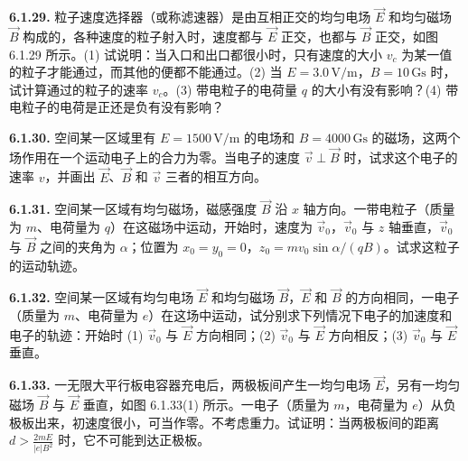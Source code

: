 \begin{center}
\end{center}

\vfill
\newpage

\textbf{6.1.29.} 粒子速度选择器（或称滤速器）是由互相正交的均匀电场 $\vec{E}$ 和均匀磁场 $\vec{B}$ 构成的，各种速度的粒子射入时，速度都与 $\vec{E}$ 正交，也都与 $\vec{B}$ 正交，如图 6.1.29 所示。(1) 试说明：当入口和出口都很小时，只有速度的大小 $v_{c}$ 为某一值的粒子才能通过，而其他的便都不能通过。(2) 当 $E = 3.0\,\mathrm{V/m}$，$B = 10\,\mathrm{Gs}$ 时，试计算通过的粒子的速率 $v_{c}$。(3) 带电粒子的电荷量 $q$ 的大小有没有影响？(4) 带电粒子的电荷是正还是负有没有影响？

\begin{center}
\end{center}

\vfill
\newpage

\textbf{6.1.30.} 空间某一区域里有 $E = 1500\,\mathrm{V/m}$ 的电场和 $B = 4000\,\mathrm{Gs}$ 的磁场，这两个场作用在一个运动电子上的合力为零。当电子的速度 $\vec{v} \perp \vec{B}$ 时，试求这个电子的速率 $v$，并画出 $\vec{E}$、$\vec{B}$ 和 $\vec{v}$ 三者的相互方向。

\begin{center}
\end{center}

\vfill
\newpage

\textbf{6.1.31.} 空间某一区域有均匀磁场，磁感强度 $\vec{B}$ 沿 $x$ 轴方向。一带电粒子（质量为 $m$、电荷量为 $q$）在这磁场中运动，开始时，速度为 $\vec{v}_{0}$，$\vec{v}_{0}$ 与 $z$ 轴垂直，$\vec{v}_{0}$ 与 $\vec{B}$ 之间的夹角为 $\alpha$；位置为 $x_{0} = y_{0} = 0$，$z_{0} = mv_{0}\sin\alpha / (qB)$。试求这粒子的运动轨迹。

\vfill
\newpage

\textbf{6.1.32.} 空间某一区域有均匀电场 $\vec{E}$ 和均匀磁场 $\vec{B}$，$\vec{E}$ 和 $\vec{B}$ 的方向相同，一电子（质量为 $m$、电荷量为 $e$）在这场中运动，试分别求下列情况下电子的加速度和电子的轨迹：开始时 (1) $\vec{v}_{0}$ 与 $\vec{E}$ 方向相同；(2) $\vec{v}_{0}$ 与 $\vec{E}$ 方向相反；(3) $\vec{v}_{0}$ 与 $\vec{E}$ 垂直。

\vfill
\newpage

\textbf{6.1.33.} 一无限大平行板电容器充电后，两极板间产生一均匀电场 $\vec{E}$，另有一均匀磁场 $\vec{B}$ 与 $\vec{E}$ 垂直，如图 6.1.33(1) 所示。一电子（质量为 $m$，电荷量为 $e$）从负极板出来，初速度很小，可当作零。不考虑重力。试证明：当两极板间的距离 $\displaystyle d > \frac{2mE}{\lvert e \rvert B^{2}}$ 时，它不可能到达正极板。

